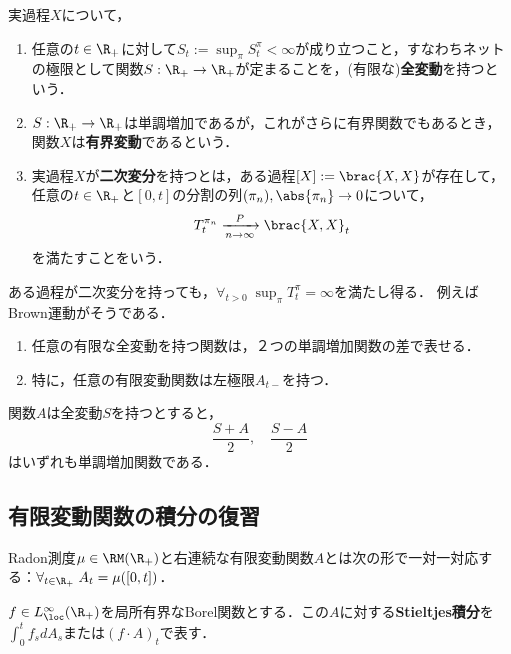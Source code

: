 \documentclass[uplatex,dvipdfmx]{jsreport}
\begin{document}
\begin{definition}
    実過程$X$について，
    \begin{enumerate}
        \item 任意の$t\in\R_+$に対して$S_t:=\sup_{\pi}S^\pi_t<\infty$が成り立つこと，すなわちネットの極限として関数$S:\R_+\to\R_+$が定まることを，(有限な)\textbf{全変動}を持つという．
        \item $S:\R_+\to\R_+$は単調増加であるが，これがさらに有界関数でもあるとき，関数$X$は\textbf{有界変動}であるという．
        \item 実過程$X$が\textbf{二次変分}を持つとは，ある過程$[X]:=\brac{X,X}$が存在して，任意の$t\in\R_+$と$[0,t]$の分割の列$(\pi_n),\abs{\pi_n}\to0$について，
        \[T_t^{\pi_n}\xrightarrow[n\to\infty]{P}\brac{X,X}_t\]
        を満たすことをいう．
    \end{enumerate}
\end{definition}
\begin{remark}
    ある過程が二次変分を持っても，$\forall_{t>0}\;\sup_{\pi}T^\pi_t=\infty$を満たし得る．
    例えばBrown運動がそうである．
\end{remark}

\begin{proposition}\mbox{}
    \begin{enumerate}
        \item 任意の有限な全変動を持つ関数は，２つの単調増加関数の差で表せる．
        \item 特に，任意の有限変動関数は左極限$A_{t-}$を持つ．
    \end{enumerate}
\end{proposition}
\begin{Proof}
    関数$A$は全変動$S$を持つとすると，
    \[\frac{S+A}{2},\quad\frac{S-A}{2}\]
    はいずれも単調増加関数である．
\end{Proof}

\subsection{有限変動関数の積分の復習}

\begin{theorem}
    Radon測度$\mu\in\RM(\R_+)$と右連続な有限変動関数$A$とは次の形で一対一対応する：$\forall_{t\in\R_+}\;A_t=\mu([0,t])$．
\end{theorem}

\begin{definition}
    $f\in L^\infty_\loc(\R_+)$を局所有界なBorel関数とする．この$A$に対する\textbf{Stieltjes積分}を$\int^t_0f_sdA_s$または$(f\cdot A)_t$で表す．
\end{definition}
\end{document}
